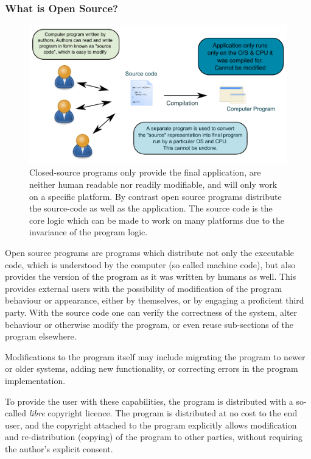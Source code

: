 \documentclass[10pt]{article}
\begin{document}
\subsubsection{What is Open Source?}
\begin{figure}
 \includegraphics[width=0.7 \textwidth,keepaspectratio=true]{./figures/compilation.pdf}
 \caption{Closed-source programs only provide the final application, are neither human readable nor readily modifiable, and will only work on a specific platform. By contrast open source programs distribute the source-code as well as the application. The source code is the core logic which can be made to work on many platforms due to the invariance of the program logic.}
 \label{fig:compilation}
\end{figure}
Open source programs are programs which distribute not only the executable code, which is understood by the computer (so called machine code), but also provides the version of the program as it was written by humans as well. This provides external users with the possibility of modification of the program behaviour or appearance, either by themselves, or by engaging a proficient third party. With the source code one can verify the correctness of the system, alter behaviour or otherwise modify the program, or even reuse sub-sections of the program elsewhere. 

Modifications to the program itself may include migrating the program to newer or older systems, adding new functionality, or correcting errors in the program implementation.  
 
To provide the user with these capabilities, the program is distributed with a so-called \textit{libre} copyright licence. The program is distributed at no cost to the end user, and the copyright attached to the program explicitly allows modification and re-distribution (copying) of the program to other parties, without requiring the author's explicit consent.  
\end{document}
